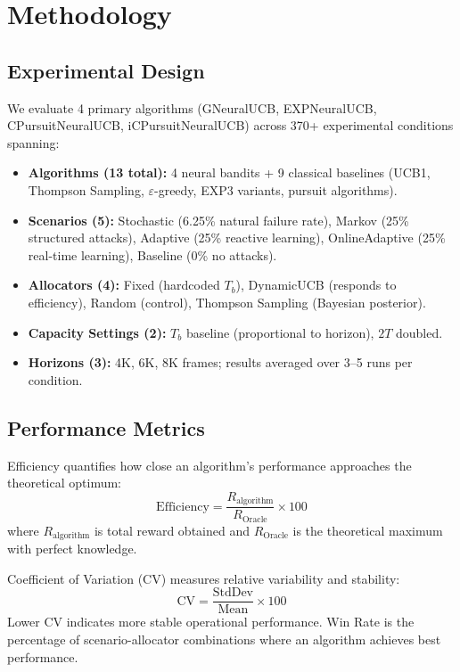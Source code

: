 \documentclass[10pt,twocolumn,journal]{IEEEtran}
\begin{document}
\section{Methodology}
\label{sec:methodology}

\subsection{Experimental Design}

We evaluate 4 primary algorithms (GNeuralUCB, EXPNeuralUCB, CPursuitNeuralUCB, iCPursuitNeuralUCB) across 370+ experimental conditions spanning:

\begin{itemize}
  \item \textbf{Algorithms (13 total):} 4 neural bandits + 9 classical baselines (UCB1, Thompson Sampling, $\varepsilon$-greedy, EXP3 variants, pursuit algorithms).
  \item \textbf{Scenarios (5):} Stochastic (6.25\% natural failure rate), Markov (25\% structured attacks), Adaptive (25\% reactive learning), OnlineAdaptive (25\% real-time learning), Baseline (0\% no attacks).
  \item \textbf{Allocators (4):} Fixed (hardcoded $T_b$), DynamicUCB (responds to efficiency), Random (control), Thompson Sampling (Bayesian posterior).
  \item \textbf{Capacity Settings (2):} $T_b$ baseline (proportional to horizon), $2T$ doubled.
  \item \textbf{Horizons (3):} 4K, 6K, 8K frames; results averaged over 3--5 runs per condition.
\end{itemize}

\subsection{Performance Metrics}

Efficiency quantifies how close an algorithm's performance approaches the theoretical optimum:
\[
\text{Efficiency} = \frac{R_{\text{algorithm}}}{R_{\text{Oracle}}} \times 100
\]
where $R_{\text{algorithm}}$ is total reward obtained and $R_{\text{Oracle}}$ is the theoretical maximum with perfect knowledge.

Coefficient of Variation (CV) measures relative variability and stability:
\[
\text{CV} = \frac{\text{StdDev}}{\text{Mean}} \times 100
\]
Lower CV indicates more stable operational performance. Win Rate is the percentage of scenario-allocator combinations where an algorithm achieves best performance.
\end{document}
